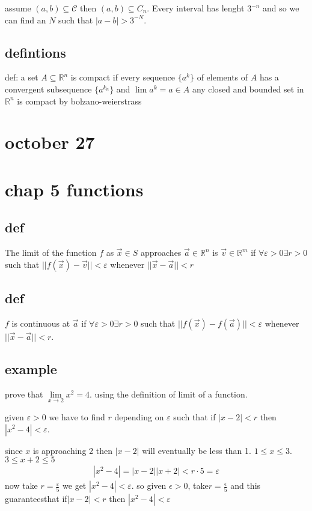 \documentclass[letterpaper]{article}
\begin{document}
assume $(a,b)\subseteq\mathcal{C}$ then $(a,b)\subseteq C_n$. Every interval has lenght $3^{-n}$ and so we can find an $N$ such that $|a-b|>3^{-N}$.

\subsection*{defintions}
def: a set $A\subseteq\mathbb{R}^n$ is compact if every sequence $\{a^k\}$ of elements of $A$ has a convergent subsequence $\{a^{k_n}\}$ and $\lim a^k=a\in A$ any closed and bounded set in $\mathbb{R}^n$ is compact by bolzano-weierstrass

\section*{october 27}
\section*{chap 5 functions}
\subsection*{def}
The limit of the function $f$ as $\vec{x}\in S$ approaches $\vec{a}\in \mathbb{R}^n$ is $\vec{v}\in \mathbb{R}^m$ if $\forall \varepsilon>0\exists r>0$ such that $||f(\vec{x})-\vec{v}||<\varepsilon$ whenever $||\vec{x}-\vec{a}||<r$
\subsection*{def}
$f$ is continuous at $\vec{a}$ if $\forall \varepsilon>0\exists r>0$ such that $||f(\vec{x})-f(\vec{a})||<\varepsilon$ whenever $||\vec{x}-\vec{a}||<r$.
\subsection*{example}
prove that $\lim\limits_{x\to 2} x^2=4$. using the definition of limit of a function.

given $\varepsilon>0$ we have to find $r$ depending on $\varepsilon$ such that if $|x-2|<r$ then $|x^2-4|<\varepsilon$.

since $x$ is approaching 2 then $|x-2|$ will eventually be less than 1. $1\le x\le 3$. $3\le x+2\le 5$
\begin{align*}
  |x^2-4|=|x-2||x+2|<r\cdot 5=\varepsilon
\end{align*}
now take $r=\frac{\varepsilon}{5}$ we get $|x^2-4|<\varepsilon$. so given $\epsilon>0$, take$r=\frac{\epsilon}{5}$ and this guaranteesthat if$|x-2|<r$ then $|x^2-4|<\varepsilon$
\end{document}
